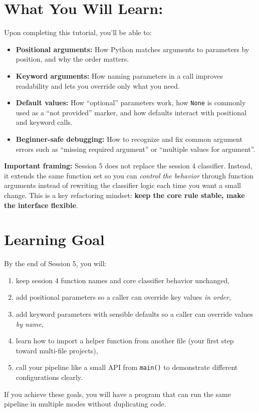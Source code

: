 \section{What You Will Learn:}

Upon completing this tutorial, you'll be able to:
\begin{itemize}\setlength{\itemsep}{0pt}
    \item \textbf{Positional arguments:} How Python matches arguments to parameters by position, and why the order matters.
    \item \textbf{Keyword arguments:} How naming parameters in a call improves readability and lets you override only what you need.
    \item \textbf{Default values:} How ``optional'' parameters work, how \texttt{None} is commonly used as a ``not provided'' marker, and how defaults interact with positional and keyword calls.
    \item \textbf{Beginner-safe debugging:} How to recognize and fix common argument errors such as ``missing required argument'' or ``multiple values for argument''.
\end{itemize}


\noindent
\textbf{Important framing:} Session 5 does not replace the session 4 classifier.
Instead, it extends the same function set so you can \textit{control the behavior} through function arguments
instead of rewriting the classifier logic each time you want a small change.
This is a key refactoring mindset: \textbf{keep the core rule stable, make the interface flexible}.

\section{Learning Goal}
By the end of Session 5, you will:
\begin{enumerate}
    \item keep session 4 function names and core classifier behavior unchanged,
    \item add positional parameters so a caller can override key values \textit{in order},
    \item add keyword parameters with sensible defaults so a caller can override values \textit{by name},
    \item learn how to import a helper function from another file (your first step toward multi-file projects),
    \item call your pipeline like a small API from \texttt{main()} to demonstrate different configurations clearly.
\end{enumerate}
\noindent
If you achieve these goals, you will have a program that can run the same pipeline in multiple modes without duplicating code.

